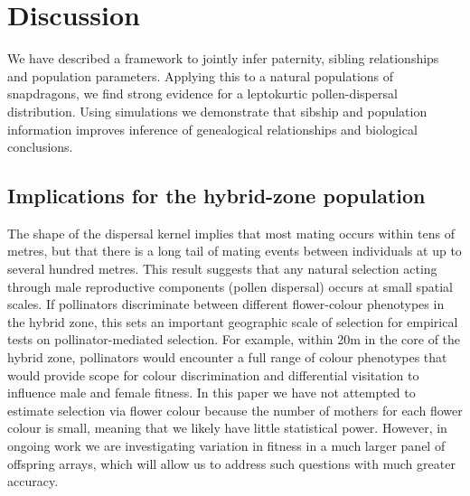 \documentclass[10pt, a4paper, twocolumn]{article} %
\begin{document}
\section{Discussion}

We have described a framework to jointly infer paternity, sibling relationships and population parameters. 
Applying this to a natural populations of snapdragons, we find strong evidence for a leptokurtic pollen-dispersal distribution.
Using simulations we demonstrate that sibship and population information improves inference of genealogical relationships and biological conclusions.

\subsection{Implications for the hybrid-zone population}

The shape of the dispersal kernel implies that most mating occurs within tens of metres, but that there is a long tail of mating events between individuals at up to several hundred metres. This result suggests that any natural selection acting through male reproductive components (pollen dispersal) occurs at small spatial scales. If pollinators discriminate between different flower-colour phenotypes in the hybrid zone, this sets an important geographic scale of selection for empirical tests on pollinator-mediated selection. For example, within 20m in the core of the hybrid zone, pollinators would encounter a full range of colour phenotypes that would provide scope for colour discrimination and differential visitation to influence male and female fitness. In this paper we have not attempted to estimate selection via flower colour because the number of mothers for each flower colour is small, meaning that we likely have little statistical power. However, in ongoing work we are investigating variation in fitness in a much larger panel of offspring arrays, which will allow us to address such questions with much greater accuracy.
\end{document}
